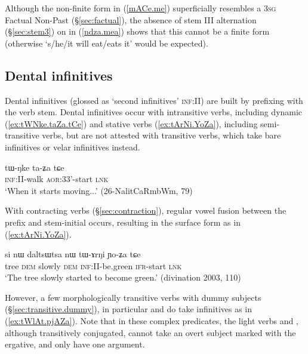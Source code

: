 Although the non-finite form  in  (\ref{mACe.me}) superficially resembles a \textsc{3sg} Factual Non-Past (§\ref{sec:factual}), the absence of stem III alternation (§\ref{sec:stem3}) on  in (\ref{ndza.mea}) shows that this cannot be a finite form (otherwise  `s/he/it will eat/eats it' would be expected).

\subsection{Dental infinitives} \label{sec:dental.inf}
Dental infinitives (glossed as `second infinitives' \textsc{inf}:II) are built by prefixing  with the verb stem. Dental infinitives occur with intransitive verbs, including dynamic (\ref{ex:tWNke.taZa.tCe}) and stative verbs (\ref{ex:tArNi.YoZa}), including semi-transitive verbs, but are not attested with transitive verbs, which take bare infinitives or velar infinitives instead.

\begin{exe} 
\ex \label{ex:tWNke.taZa.tCe}
\gll tɯ-ŋke ta-ʑa tɕe \\
\textsc{inf}:\textsc{II}-walk \textsc{aor}:3\fl{}3'-start  \textsc{lnk} \\
\glt `When it starts moving...' (26-NalitCaRmbWm, 79)
\end{exe} 

 
With contracting verbs (§\ref{sec:contraction}), regular vowel fusion between the  prefix and stem-initial   occurs, resulting in the surface form  as in (\ref{ex:tArNi.YoZa}).

\begin{exe} 
\ex \label{ex:tArNi.YoZa}
\gll si nɯ daltsɯtsa nɯ tɯ-ɤrŋi ɲo-ʑa tɕe \\
tree \textsc{dem} slowly \textsc{dem} \textsc{inf}:II-be.green \textsc{ifr}-start \textsc{lnk} \\
\glt `The tree slowly started to become green.' (divination 2003, 110)
\end{exe} 

However, a few morphologically transitive verbs with dummy subjects (§\ref{sec:transitive.dummy}), in particular  and  do take  infinitives as in (\ref{ex:tWlAt.pjAZa}).  Note that in these complex predicates, the light verbs  and , although transitively conjugated, cannot take an overt subject marked with the ergative, and only have one argument.
 
